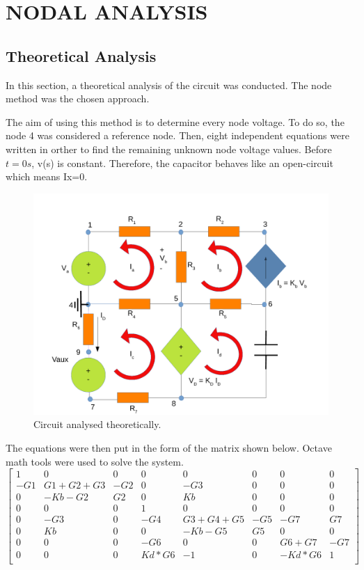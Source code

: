 \section{NODAL ANALYSIS}


\subsection{Theoretical Analysis}


In this section, a theoretical analysis of the circuit was conducted. The node method was the chosen approach.

The aim of using this method is to determine every node voltage. To do so, the node 4 was considered a reference node. Then, eight independent equations were written in orther to find the remaining unknown node voltage values. Before $t=0s$, v(s) is constant. Therefore, the capacitor behaves like an open-circuit which means Ix=0.

\begin{figure}[ht] \centering
\includegraphics[width=0.8\linewidth]{sim1draw.pdf}
\caption{Circuit analysed theoretically.}
\label{simdraw}
\end{figure}

The equations were then put in the form of the matrix shown below. Octave math tools were used to solve the system.\\

$\begin{bmatrix}
1 & 0 & 0 & 0 & 0 & 0 & 0 & 0\\
-G1 & G1+G2+G3 & -G2 & 0 & -G3 & 0 & 0 & 0\\
0 &-Kb-G2 & G2 & 0 & Kb & 0 & 0 & 0\\
0 & 0 & 0 & 1 & 0 & 0 & 0 & 0\\
0 & -G3 & 0 & -G4 & G3+G4+G5 & -G5 & -G7 & G7\\
0 & Kb & 0 & 0 & -Kb-G5 & G5 & 0 & 0\\
0 & 0 & 0 & -G6 & 0 & 0 & G6+G7 & -G7\\
0 & 0 & 0 & Kd*G6 & -1 & 0 & -Kd*G6 & 1\\
\end{bmatrix}
$

